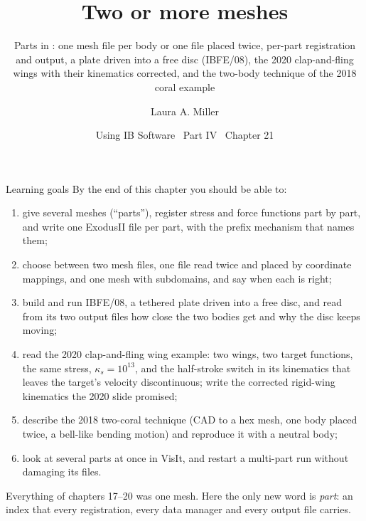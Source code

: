\documentclass[aspectratio=169,11pt]{beamer}
\title[Two or more meshes]{Two or more meshes}
\subtitle{Parts in \code{IBFEMethod}: one mesh file per body or one file placed twice, per-part registration and output, a plate driven into a free disc (IBFE/08), the 2020 clap-and-fling wings with their kinematics corrected, and the two-body technique of the 2018 coral example}
\author[Miller]{Laura A. Miller}
\institute[UArizona]{Department of Mathematics, University of Arizona}
\date{Using IB Software \textbullet\ Part IV \textbullet\ Chapter 21}
\begin{document}
\begin{frame}[plain]
\end{frame}

\begin{frame}{Learning goals}
\label{fr:goals}
\footnotesize By the end of this chapter you should be able to:
\begin{enumerate}
  \item give  several meshes (``parts''), register stress and force functions part by part, and write one ExodusII file per part, with the prefix mechanism that names them;
  \item choose between two mesh files, one file read twice and placed by coordinate mappings, and one mesh with subdomains, and say when each is right;
  \item build and run IBFE/08, a tethered plate driven into a free disc, and read from its two output files how close the two bodies get and why the disc keeps moving;
  \item read the 2020 clap-and-fling wing example: two wings, two target functions, the same stress, $\kappa_s = 10^{13}$, and the half-stroke switch in its kinematics that leaves the target's velocity discontinuous; write the corrected rigid-wing kinematics the 2020 slide promised;
  \item describe the 2018 two-coral technique (CAD to a hex mesh, one body placed twice, a bell-like bending motion) and reproduce it with a neutral body;
  \item look at several parts at once in VisIt, and restart a multi-part run without damaging its files.
\end{enumerate}
\begin{punchbox}
\footnotesize Everything of chapters 17--20 was one mesh. Here the only new word is \emph{part}: an index that every registration, every data manager and every output file carries.
\end{punchbox}
\end{frame}
\end{document}
